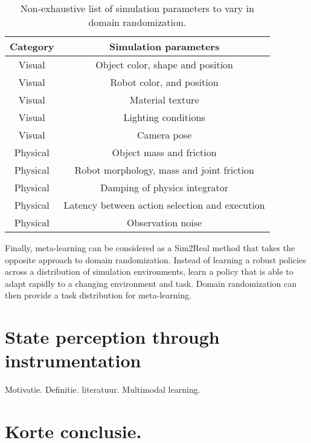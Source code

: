 \documentclass[\home/main.tex]{subfiles}
\begin{document}
\begin{table}[htb]
\centering
\caption{Non-exhaustive list of simulation parameters to vary in domain randomization.}
\begin{tabular}[t]{c c}
	\toprule
	Category    &   Simulation parameters	 						\\
	\midrule
	Visual     	&   Object color, shape and position				\\
	Visual     	&   Robot color, and position						\\
	Visual		&   Material texture								\\
	Visual     	&   Lighting conditions								\\
	Visual     	&   Camera pose										\\
	Physical	& 	Object mass and friction 						\\
	Physical	& 	Robot morphology, mass and joint friction 		\\
	Physical	&  	Damping of physics integrator					\\
	Physical	& 	Latency between action selection and execution 	\\
	Physical	& 	Observation noise 								\\
	\bottomrule
\end{tabular}
\label{table:simulation_parameters_example}
\end{table}

Finally, meta-learning can be considered as a Sim2Real method that takes the opposite approach to domain randomization. Instead of learning a robust policies across a distribution of simulation environments, learn a policy that is able to adapt rapidly to a changing environment and task. Domain randomization can then provide a task distribution for meta-learning. 

\section{State perception through instrumentation} \label{sec:lit_instrumentation}
Motivatie.
Definitie.
literatuur.
Multimodal learning.


\section{Korte conclusie.}
\end{document}
